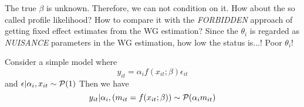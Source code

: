 \begin{question}
    The true $\beta$ is unknown. Therefore, we can not condition on it. How about the so called profile likelihood? How to compare it with the \textit{FORBIDDEN} approach of getting fixed effect estimates from the WG estimation? Since the $\theta_i$ is regarded as \textit{NUISANCE} parameters in the WG estimation, how low the status is...! Poor $\theta_i$!
\end{question}

\begin{example}
    Consider a simple model where \begin{equation*}
        y_{it}=\alpha_i f(x_{it};\beta)\epsilon_{it}
    \end{equation*}
    and $\epsilon|\alpha_i,x_{it}\sim \mathcal{P}(1)$ Then we have \begin{equation*}
        y_{it} | \alpha_i,\left(m_{it}= f(x_{it};\beta)\right)\sim \mathcal{P}(\alpha_i m_{it})
    \end{equation*}
\end{example}

